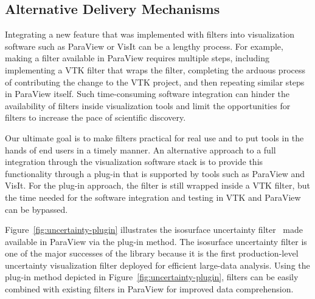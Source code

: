 
\subsection{Alternative Delivery Mechanisms}


Integrating a new feature that was implemented with \vtkm filters into visualization software such as ParaView or VisIt can be a lengthy process.
For example, making a \vtkm filter available in ParaView requires multiple steps, including implementing a VTK filter that wraps the \vtkm filter, completing the arduous process of contributing the change to the VTK project, and then repeating similar steps in ParaView itself.
Such time-consuming software integration can hinder the availability of \vtkm filters inside visualization tools and limit the opportunities for \vtkm filters to increase the pace of scientific discovery.

Our ultimate goal is to make \vtkm filters practical for real use and to put tools in the hands of end users in a timely manner.
An alternative approach to a full integration through the visualization software stack is to provide this functionality through a plug-in that is supported by tools such as ParaView and VisIt.
For the plug-in approach, the \vtkm filter is still wrapped inside a VTK filter, but the time needed for the software integration and testing in VTK and ParaView can be bypassed.

Figure~\ref{fig:uncertainty-plugin} illustrates the \vtkm isosurface uncertainty filter~\citep{Wang2023, Athawale21} made available in ParaView via the plug-in method. The isosurface uncertainty filter is one of the major successes of the \vtkm library because it is the first production-level uncertainty visualization filter deployed for efficient large-data analysis. Using the plug-in method depicted in Figure~\ref{fig:uncertainty-plugin}, \vtkm filters can be easily combined with existing filters in ParaView for improved data comprehension.



